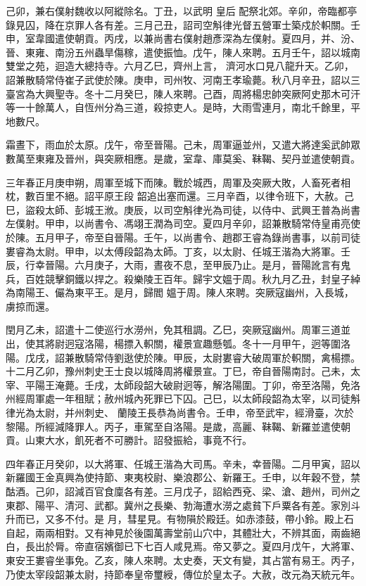 \begin{pinyinscope}
 己卯，兼右僕射魏收以阿縱除名。丁丑，以武明
 皇后
 配祭北郊。辛卯，帝臨都亭錄見囚，降在京罪人各有差。三月己丑，詔司空斛律光督五營軍士築戍於軹關。壬申，室韋國遣使朝貢。丙戌，以兼尚書右僕射趙彥深為左僕射。夏四月，并、汾、晉、東雍、南汾五州蟲旱傷稼，遣使振恤。戊午，陳人來聘。五月壬午，詔以城南雙堂之苑，迴造大總持寺。六月乙巳，齊州上言，
 濟河水口見八龍升天。乙卯，詔兼散騎常侍崔子武使於陳。庚申，司州牧、河南王孝瑜薨。秋八月辛丑，詔以三臺宮為大興聖寺。冬十二月癸巳，陳人來聘。己酉，周將楊忠帥突厥阿史那木可汗等一十餘萬人，自恆州分為三道，殺掠吏人。是時，大雨雪連月，南北千餘里，平地數尺。



 霜晝下，雨血於太原。戊午，帝至晉陽。己未，周軍逼並州，又遣大將達奚武帥眾數萬至東雍及晉州，與突厥相應。是歲，室韋、庫莫奚、靺鞨、契丹並遣使朝貢。



 三年春正月庚申朔，周軍至城下而陳。戰於城西，周軍及突厥大敗，人畜死者相枕，數百里不絕。詔平原王段
 韶追出塞而還。三月辛酉，以律令班下，大赦。己巳，盜殺太師、彭城王浟。庚辰，以司空斛律光為司徒，以侍中、武興王普為尚書左僕射。甲申，以尚書令、馮翊王潤為司空。夏四月辛卯，詔兼散騎常侍皇甫亮使於陳。五月甲子，帝至自晉陽。壬午，以尚書令、趙郡王睿為錄尚書事，以前司徒婁睿為太尉。甲申，以太傅段韶為太師。丁亥，以太尉、任城王湝為大將軍。壬辰，行幸晉陽。六月庚子，大雨，晝夜不息，至甲辰乃止。是月，晉陽訛言有鬼兵，百姓競擊銅鐵以捍之。殺樂陵王百年。歸宇文媼于周。秋九月乙丑，封皇子綽為南陽王、儼為東平王。是月，歸閻
 媼于周。陳人來聘。突厥寇幽州，入長城，虜掠而還。



 閏月乙未，詔遣十二使巡行水澇州，免其租調。乙巳，突厥寇幽州。周軍三道並出，使其將尉迥寇洛陽，楊摽入軹關，權景宣趣懸瓠。冬十一月甲午，迥等圍洛陽。戊戌，詔兼散騎常侍劉逖使於陳。甲辰，太尉婁睿大破周軍於軹關，禽楊摽。十二月乙卯，豫州刺史王士良以城降周將權景宣。丁巳，帝自晉陽南討。己未，太宰、平陽王淹薨。壬戌，太師段韶大破尉迥等，解洛陽圍。丁卯，帝至洛陽，免洛州經周軍處一年租賦；赦州城內死罪已下囚。己巳，以太師段韶為太宰，以司徒斛律光為太尉，并州刺史、
 蘭陵王長恭為尚書令。壬申，帝至武牢，經滑臺，次於黎陽。所經減降罪人。丙子，車駕至自洛陽。是歲，高麗、靺鞨、新羅並遣使朝貢。山東大水，飢死者不可勝計。詔發振給，事竟不行。



 四年春正月癸卯，以大將軍、任城王湝為大司馬。辛未，幸晉陽。二月甲寅，詔以新羅國王金真興為使持節、東夷校尉、樂浪郡公、新羅王。壬申，以年穀不登，禁酤酒。己卯，詔減百官食廩各有差。三月戊子，詔給西兗、梁、滄、趙州，司州之東郡、陽平、清河、武都。冀州之長樂、勃海遭水澇之處貧下戶粟各有差。家別斗升而已，又多不付。是
 月，彗星見。有物隕於殿廷。如赤漆鼓，帶小鈴。殿上石自起，兩兩相對。又有神見於後園萬壽堂前山穴中，其體壯大，不辨其面，兩齒絕白，長出於脣。帝直宿嬪御已下七百人咸見焉。帝又夢之。夏四月戊午，大將軍、東安王婁睿坐事免。乙亥，陳人來聘。太史奏，天文有變，其占當有易王。丙子，乃使太宰段韶兼太尉，持節奉皇帝璽綬，傳位於皇太子。大赦，改元為天統元年。




\end{pinyinscope}
